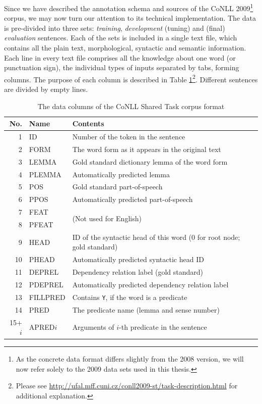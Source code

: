 \documentclass[12pt,notitlepage,a4paper]{report}
\begin{document}
Since we have described the annotation schema and sources of the CoNLL 2009\footnote{As the concrete data format differs slightly from the 2008 version, we will now refer solely to the 2009 data sets used in this thesis.} corpus, we may now turn our attention to its technical implementation. The data is pre-divided into three sets: \emph{training}, \emph{development} (tuning) and (final) \emph{evaluation} sentences. Each of the sets is included in a single text file, which contains all the plain text, morphological, syntactic and semantic information. Each line in every text file comprises all the knowledge about one word (or punctuation sign), the individual types of inputs separated by tabs, forming columns. The purpose of each column is described in Table \ref{tab:st-columns}\footnote{Please see \url{http://ufal.mff.cuni.cz/conll2009-st/task-description.html} for additional explanation.}. Different sentences are divided by empty lines.

\begin{table}[htb]\footnotesize
\caption{The data columns of the CoNLL Shared Task corpus format}\label{tab:st-columns}
\begin{center}
\begin{tabular}{|r|l|l|}\hline
\bf No. & \bf Name & \bf Contents \\\hline
1 & ID & Number of the token in the sentence \\
2 & FORM & The word form as it appears in the original text \\
3 & LEMMA & Gold standard dictionary lemma of the word form \\
4 & PLEMMA & Automatically predicted lemma \\
5 & POS & Gold standard part-of-speech \\
6 & PPOS & Automatically predicted part-of-speech \\
7 & FEAT & \multirow{2}{*}{(Not used for English)} \\
8 & PFEAT & \\
9 & HEAD & ID of the syntactic head of this word (0 for root node; gold standard) \\
10 & PHEAD & Automatically predicted syntactic head ID \\
11 & DEPREL & Dependency relation label (gold standard) \\
12 & PDEPREL & Automatically predicted dependency relation label \\
13 & FILLPRED & Contains \texttt{Y}, if the word is a predicate \\
14 & PRED & The predicate name (lemma and sense number) \\
15+$i$ & APRED$i$ & Arguments of $i$-th predicate in the sentence \\\hline
\end{tabular}
\end{center}
\end{table}
\end{document}
